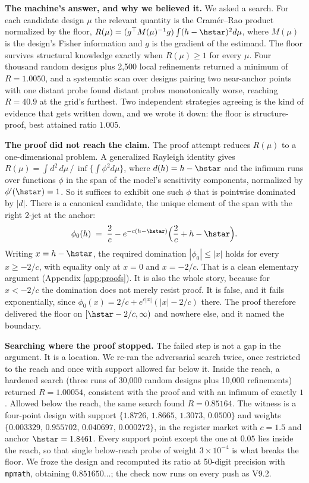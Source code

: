 \documentclass{article}
\begin{document}
\textbf{The machine's answer, and why we believed it.} We asked a search. For
each candidate design $\mu$ the relevant quantity is the Cram\'er--Rao
product normalized by the floor,
$R(\mu) = (g^\top M(\mu)^{-1} g)\int (h-\hstar)^2 d\mu$, where $M(\mu)$ is
the design's Fisher information and $g$ is the gradient of the estimand. The
floor survives structural knowledge exactly when $R(\mu)\ge 1$ for every
$\mu$. Four thousand random designs plus 2,500 local refinements returned a
minimum of $R = 1.0050$, and a systematic scan over designs pairing two
near-anchor points with one distant probe found distant probes monotonically
worse, reaching $R = 40.9$ at the grid's furthest. Two independent strategies
agreeing is the kind of evidence that gets written down, and we wrote it
down: the floor is structure-proof, best attained ratio $1.005$.

\textbf{The proof did not reach the claim.} The proof attempt reduces
$R(\mu)$ to a one-dimensional problem. A generalized Rayleigh identity gives
$R(\mu) = \int d^2\, d\mu \,/\, \inf\{\int \phi^2 d\mu\}$, where $d(h) = h -
\hstar$ and the infimum runs over functions $\phi$ in the span of the model's
sensitivity components, normalized by $\phi'(\hstar) = 1$. So it suffices to
exhibit one such $\phi$ that is pointwise dominated by $|d|$. There is a
canonical candidate, the unique element of the span with the right 2-jet at
the anchor:
\[
\phi_0(h) \;=\; \frac{2}{c} - e^{-c(h-\hstar)}\Big(\frac{2}{c} + h - \hstar\Big).
\]
Writing $x = h - \hstar$, the required domination $|\phi_0| \le |x|$ holds for
every $x \ge -2/c$, with equality only at $x = 0$ and $x = -2/c$. That is a
clean elementary argument (Appendix \ref{app:proofs}). It is also the whole
story, because for $x < -2/c$ the domination does not merely resist proof. It
is false, and it fails exponentially, since $\phi_0(x) = 2/c +
e^{c|x|}(|x| - 2/c)$ there. The proof therefore delivered the floor on
$[\hstar - 2/c, \infty)$ and nowhere else, and it named the boundary.

\textbf{Searching where the proof stopped.} The failed step is not a gap in
the argument. It is a location. We re-ran the adversarial search twice, once
restricted to the reach and once with support allowed far below it. Inside
the reach, a hardened search (three runs of 30,000 random designs plus
10,000 refinements) returned $R = 1.00054$, consistent with the proof and
with an infimum of exactly $1$. Allowed below the reach, the same search
found $R = 0.85164$. The witness is a four-point design with support
$\{1.8726,\, 1.8665,\, 1.3073,\, 0.0500\}$ and weights
$\{0.003329,\, 0.955702,\, 0.040697,\, 0.000272\}$, in the register market
with $c = 1.5$ and anchor $\hstar = 1.8461$. Every support point except the
one at $0.05$ lies inside the reach, so that single below-reach probe of
weight $3\times 10^{-4}$ is what breaks the floor. We froze the design and
recomputed its ratio at 50-digit precision with \texttt{mpmath}, obtaining
$0.851650\ldots$; the check now runs on every push as V9.2.
\end{document}
